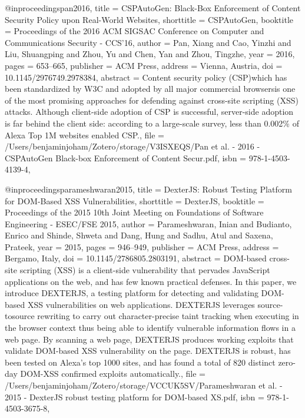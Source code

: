 @inproceedings{pan2016,
  title = {{{CSPAutoGen}}: {{Black}}-Box {{Enforcement}} of {{Content Security Policy}} upon {{Real}}-World {{Websites}}},
  shorttitle = {{{CSPAutoGen}}},
  booktitle = {Proceedings of the 2016 {{ACM SIGSAC Conference}} on {{Computer}} and {{Communications Security}} - {{CCS}}'16},
  author = {Pan, Xiang and Cao, Yinzhi and Liu, Shuangping and Zhou, Yu and Chen, Yan and Zhou, Tingzhe},
  year = {2016},
  pages = {653--665},
  publisher = {{ACM Press}},
  address = {{Vienna, Austria}},
  doi = {10.1145/2976749.2978384},
  abstract = {Content security policy (CSP)\textemdash{}which has been standardized by W3C and adopted by all major commercial browsers\textemdash{}is one of the most promising approaches for defending against cross-site scripting (XSS) attacks. Although client-side adoption of CSP is successful, server-side adoption is far behind the client side: according to a large-scale survey, less than 0.002\% of Alexa Top 1M websites enabled CSP.},
  file = {/Users/benjaminjoham/Zotero/storage/V3ISXEQS/Pan et al. - 2016 - CSPAutoGen Black-box Enforcement of Content Secur.pdf},
  isbn = {978-1-4503-4139-4},
}

@inproceedings{parameshwaran2015,
  title = {{{DexterJS}}: Robust Testing Platform for {{DOM}}-Based {{XSS}} Vulnerabilities},
  shorttitle = {{{DexterJS}}},
  booktitle = {Proceedings of the 2015 10th {{Joint Meeting}} on {{Foundations}} of {{Software Engineering}} - {{ESEC}}/{{FSE}} 2015},
  author = {Parameshwaran, Inian and Budianto, Enrico and Shinde, Shweta and Dang, Hung and Sadhu, Atul and Saxena, Prateek},
  year = {2015},
  pages = {946--949},
  publisher = {{ACM Press}},
  address = {{Bergamo, Italy}},
  doi = {10.1145/2786805.2803191},
  abstract = {DOM-based cross-site scripting (XSS) is a client-side vulnerability that pervades JavaScript applications on the web, and has few known practical defenses. In this paper, we introduce DEXTERJS, a testing platform for detecting and validating DOM-based XSS vulnerabilities on web applications. DEXTERJS leverages source-tosource rewriting to carry out character-precise taint tracking when executing in the browser context \textemdash{} thus being able to identify vulnerable information flows in a web page. By scanning a web page, DEXTERJS produces working exploits that validate DOM-based XSS vulnerability on the page. DEXTERJS is robust, has been tested on Alexa's top 1000 sites, and has found a total of 820 distinct zero-day DOM-XSS confirmed exploits automatically.},
  file = {/Users/benjaminjoham/Zotero/storage/VCCUK5SV/Parameshwaran et al. - 2015 - DexterJS robust testing platform for DOM-based XS.pdf},
  isbn = {978-1-4503-3675-8},
}

